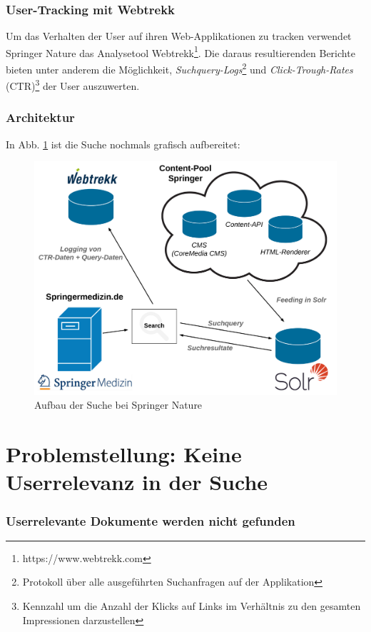\subsubsection{User-Tracking mit Webtrekk}
\label{sec:Einfuehrung:AufbauSucheBeiSpringerNature:Webtrekk}

Um das Verhalten der User auf ihren Web-Applikationen zu tracken verwendet Springer Nature das Analysetool Webtrekk\footnote{https://www.webtrekk.com}. Die daraus resultierenden Berichte bieten unter anderem die Möglichkeit, \textit{Suchquery-Logs}\footnote{Protokoll über alle ausgeführten Suchanfragen auf der Applikation} und \textit{Click-Trough-Rates} (CTR)\footnote{Kennzahl um die Anzahl der Klicks auf Links im Verhältnis zu den gesamten Impressionen darzustellen} der User auszuwerten.

\pagebreak

\subsubsection{Architektur}
\label{sec:Einfuehrung:AufbauSucheBeiSpringerNature:Architektur}

In Abb. \ref{fig:SucheSpringerNature} ist die Suche nochmals grafisch aufbereitet:

\begin{figure}[H]
\centering
\includegraphics[width=0.5\linewidth]{gfx/AufbauSucheSpringerNature}
\caption[Aufbau der Suche bei Springer Nature]{Aufbau der Suche bei Springer Nature}
\label{fig:SucheSpringerNature}
\end{figure}

\section{Problemstellung: Keine Userrelevanz in der Suche}
\label{sec:Einfuehrung:Problemstellung}

\subsubsection{Userrelevante Dokumente werden nicht gefunden}
\label{sec:Einfuehrung:Problemstellung:Userrelevanz}

